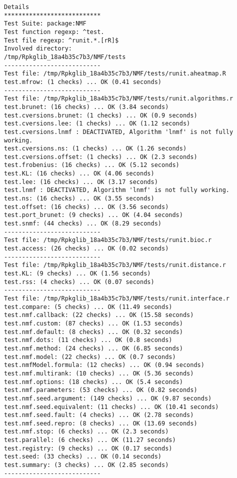 \documentclass[10pt]{article}\usepackage{graphicx, color}
\begin{document}
\begin{verbatim}
Details 
*************************** 
Test Suite: package:NMF 
Test function regexp: ^test. 
Test file regexp: ^runit.*.[rR]$ 
Involved directory: 
/tmp/Rpkglib_18a4b35c7b3/NMF/tests 
--------------------------- 
Test file: /tmp/Rpkglib_18a4b35c7b3/NMF/tests/runit.aheatmap.R 
test.mfrow: (1 checks) ... OK (0.41 seconds)
--------------------------- 
Test file: /tmp/Rpkglib_18a4b35c7b3/NMF/tests/runit.algorithms.r 
test.brunet: (16 checks) ... OK (3.84 seconds)
test.cversions.brunet: (1 checks) ... OK (0.9 seconds)
test.cversions.lee: (1 checks) ... OK (1.12 seconds)
test.cversions.lnmf : DEACTIVATED, Algorithm 'lnmf' is not fully working.
test.cversions.ns: (1 checks) ... OK (1.26 seconds)
test.cversions.offset: (1 checks) ... OK (2.3 seconds)
test.frobenius: (16 checks) ... OK (5.12 seconds)
test.KL: (16 checks) ... OK (4.06 seconds)
test.lee: (16 checks) ... OK (3.17 seconds)
test.lnmf : DEACTIVATED, Algorithm 'lnmf' is not fully working.
test.ns: (16 checks) ... OK (3.55 seconds)
test.offset: (16 checks) ... OK (3.56 seconds)
test.port_brunet: (9 checks) ... OK (4.04 seconds)
test.snmf: (44 checks) ... OK (8.29 seconds)
--------------------------- 
Test file: /tmp/Rpkglib_18a4b35c7b3/NMF/tests/runit.bioc.r 
test.access: (26 checks) ... OK (0.02 seconds)
--------------------------- 
Test file: /tmp/Rpkglib_18a4b35c7b3/NMF/tests/runit.distance.r 
test.KL: (9 checks) ... OK (1.56 seconds)
test.rss: (4 checks) ... OK (0.07 seconds)
--------------------------- 
Test file: /tmp/Rpkglib_18a4b35c7b3/NMF/tests/runit.interface.r 
test.compare: (5 checks) ... OK (11.49 seconds)
test.nmf.callback: (22 checks) ... OK (15.58 seconds)
test.nmf.custom: (87 checks) ... OK (1.53 seconds)
test.nmf.default: (8 checks) ... OK (0.32 seconds)
test.nmf.dots: (11 checks) ... OK (0.8 seconds)
test.nmf.method: (24 checks) ... OK (6.85 seconds)
test.nmf.model: (22 checks) ... OK (0.7 seconds)
test.nmfModel.formula: (12 checks) ... OK (0.94 seconds)
test.nmf.multirank: (10 checks) ... OK (5.36 seconds)
test.nmf.options: (18 checks) ... OK (5.4 seconds)
test.nmf.parameters: (53 checks) ... OK (0.82 seconds)
test.nmf.seed.argument: (149 checks) ... OK (9.87 seconds)
test.nmf.seed.equivalent: (11 checks) ... OK (10.41 seconds)
test.nmf.seed.fault: (4 checks) ... OK (2.78 seconds)
test.nmf.seed.repro: (8 checks) ... OK (13.69 seconds)
test.nmf.stop: (6 checks) ... OK (2.3 seconds)
test.parallel: (6 checks) ... OK (11.27 seconds)
test.registry: (9 checks) ... OK (0.17 seconds)
test.seed: (33 checks) ... OK (0.14 seconds)
test.summary: (3 checks) ... OK (2.85 seconds)
--------------------------- 

\end{verbatim}
\end{document}
